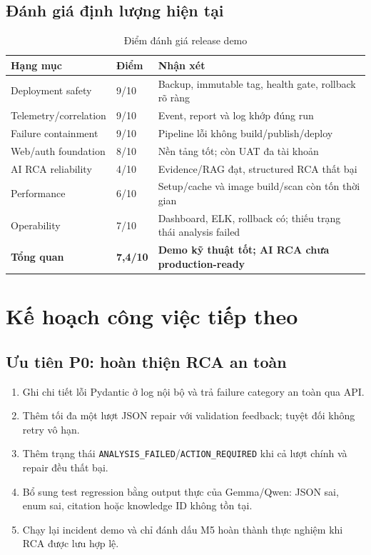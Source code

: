 \documentclass[12pt,a4paper,oneside]{report}
\newcommand{\code}[1]{\texttt{#1}}
\begin{document}
\section{Đánh giá định lượng hiện tại}

\begin{table}[H]
\centering
\caption{Điểm đánh giá release demo}
\label{tab:scores}
\begin{tabularx}{\textwidth}{L{4.5cm} C{2.0cm} Y}
\toprule
\textbf{Hạng mục} & \textbf{Điểm} & \textbf{Nhận xét} \\
\midrule
Deployment safety & 9/10 & Backup, immutable tag, health gate, rollback rõ ràng \\
Telemetry/correlation & 9/10 & Event, report và log khớp đúng run \\
Failure containment & 9/10 & Pipeline lỗi không build/publish/deploy \\
Web/auth foundation & 8/10 & Nền tảng tốt; còn UAT đa tài khoản \\
AI RCA reliability & 4/10 & Evidence/RAG đạt, structured RCA thất bại \\
Performance & 6/10 & Setup/cache và image build/scan còn tốn thời gian \\
Operability & 7/10 & Dashboard, ELK, rollback có; thiếu trạng thái analysis failed \\
\midrule
\textbf{Tổng quan} & \textbf{7,4/10} & \textbf{Demo kỹ thuật tốt; AI RCA chưa production-ready} \\
\bottomrule
\end{tabularx}
\end{table}

\chapter{Kế hoạch công việc tiếp theo}

\section{Ưu tiên P0: hoàn thiện RCA an toàn}

\begin{enumerate}
  \item Ghi chi tiết lỗi Pydantic ở log nội bộ và trả failure category an toàn qua API.
  \item Thêm tối đa một lượt JSON repair với validation feedback; tuyệt đối không retry vô hạn.
  \item Thêm trạng thái \code{ANALYSIS\_FAILED}/\code{ACTION\_REQUIRED} khi cả lượt chính và repair
  đều thất bại.
  \item Bổ sung test regression bằng output thực của Gemma/Qwen: JSON sai, enum sai, citation hoặc
  knowledge ID không tồn tại.
  \item Chạy lại incident demo và chỉ đánh dấu M5 hoàn thành thực nghiệm khi RCA được lưu hợp lệ.
\end{enumerate}
\end{document}
